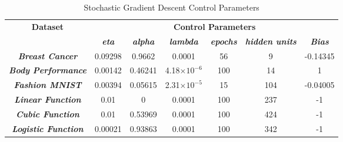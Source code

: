 \documentclass[10pt, conference]{IEEEtran}
\begin{document}
\begin{table*}[h!]
    \caption{Stochastic Gradient Descent Control Parameters}
    \begin{center}
        \begin{tabular}{|c||c|c|c|c|c|c|}
            \hline
            \textbf{Dataset}&\multicolumn{6}{|c|}{\textbf{Control Parameters}} \\
            \cline{2-7}
                        & \textbf{\textit{eta}} & \textbf{\textit{alpha}} & \textbf{\textit{lambda}} & \textbf{\textit{epochs}} & \textbf{\textit{hidden units}} & \textbf{\textit{Bias}}\\
            \hline
            \textbf{\textit{Breast Cancer}}  & 0.09298 & 0.9662 & 0.0001 & 56 & 9 & -0.14345\\
            \textbf{\textit{Body Performance}}  & 0.00142 & 0.46241 & 4.18$\times10^{-6}$ & 100 & 14 & 1\\
            \textbf{\textit{Fashion MNIST}} & 0.00394 & 0.05615 & 2.31$\times10^{-5}$ & 15 & 104 & -0.04005\\
            \textbf{\textit{Linear Function}} & 0.01 & 0 & 0.0001 & 100 & 237 & -1\\
            \textbf{\textit{Cubic Function}} & 0.01 & 0.53969 & 0.0001 & 100 & 424 &-1\\
            \textbf{\textit{Logistic Function}} & 0.00021 & 0.93863 & 0.0001 & 100 & 342 & -1\\
            \hline
        \end{tabular}
    \end{center}
    \label{table: SGD_control_parameters}
\end{table*}
\end{document}
